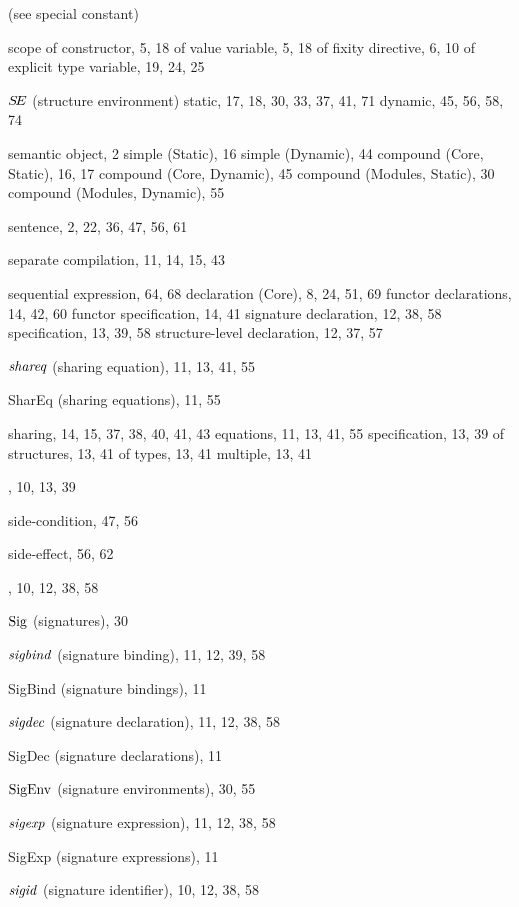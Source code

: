 \begin{theindex}
\item {\scon} (see special constant) 
\item scope 
\subitem of constructor, 5, 18
\subitem of value variable, 5, 18
\subitem of fixity directive, 6, 10
\subitem of explicit type variable, 19, 24, 25
\item $\mbox{$S\!E$}$ (structure environment) 
\subitem static, 17, 18, 30, 33, 37, 41, 71
\subitem dynamic, 45, 56, 58, 74
\item semantic object, 2
\subitem simple (Static), 16
\subitem simple (Dynamic), 44
\subitem compound (Core, Static), 16, 17
\subitem compound (Core, Dynamic), 45
\subitem compound (Modules, Static), 30
\subitem compound (Modules, Dynamic), 55
\item sentence, 2, 22, 36, 47, 56, 61
\item separate compilation, 11, 14, 15, 43
\item sequential 
\subitem expression, 64, 68
\subitem declaration (Core), 8, 24, 51, 69
\subitem functor declarations, 14, 42, 60
\subitem functor specification, 14, 41
\subitem signature declaration, 12, 38, 58
\subitem specification, 13, 39, 58
\subitem structure-level declaration, 12, 37, 57
\item ${\it shareq}$ (sharing equation), 11, 13, 41, 55
\item SharEq (sharing equations), 11, 55
\item sharing, 14, 15, 37, 38, 40, 41, 43
\subitem equations, 11, 13, 41, 55
\subitem specification, 13, 39
\subitem of structures, 13, 41
\subitem of types, 13, 41
\subitem multiple, 13, 41
\item \SHARING, 10, 13, 39
\item side-condition, 47, 56
\item side-effect, 56, 62
\item \SIG, 10, 12, 38, 58
\item ${\rm Sig}$ (signatures), 30
\item ${\it sigbind}$ (signature binding), 11, 12, 39, 58
\item SigBind (signature bindings), 11
\item ${\it sigdec}$ (signature declaration), 11, 12, 38, 58
\item SigDec (signature declarations), 11
\item ${\rm SigEnv}$ (signature environments), 30, 55
\item ${\it sigexp}$ (signature expression), 11, 12, 38, 58
\item SigExp (signature expressions), 11
\item ${\it sigid}$ (signature identifier), 10, 12, 38, 58

\end{theindex}
